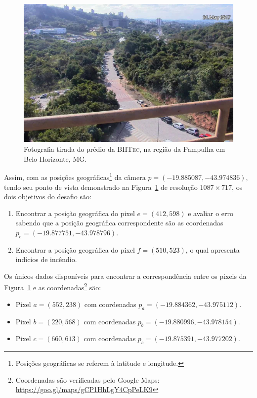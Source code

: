\documentclass[12pt]{report}
\begin{document}
{\begin{figure}[!h]
	\centering
	\includegraphics[width=0.85\columnwidth]{images/cemig-pic.jpg}
	\caption{Fotografia tirada do prédio da \textsc{BHTec}, na região da Pampulha em Belo Horizonte, MG.}
	\label{fig:bhtec}
\end{figure}

\noindent Assim, com as posições geográficas\footnote{Posições geográficas se referem à latitude e longitude.} da câmera $p = (-19.885087, -43.974836)$, tendo seu ponto de vista demonstrado na Figura~\ref{fig:bhtec} de resolução $1087 \times 717$, os dois objetivos do desafio são:
\begin{enumerate}
	\item Encontrar a posição geográfica do pixel $e = (412, 598)$ e avaliar o erro sabendo que a posição geográfica correspondente são as coordenadas $p_{e} = (-19.877751, -43.978796)$.
	\item Encontrar a posição geográfica do pixel $f = (510, 523)$, o qual apresenta indícios de incêndio.
\end{enumerate}

\noindent Os únicos dados disponíveis para encontrar a correspondência entre os pixeis da Figura~\ref{fig:bhtec} e as coordenadas\footnote{Coordenadas são verificadas pelo Google Maps: \url{https://goo.gl/maps/gCP1HhLgY4CpPeLK9}} são:
\begin{itemize}
	\item Pixel $a = (552, 238)$ com coordenadas $p_{a} = (-19.884362, -43.975112)$.
	\item Pixel $b = (220, 568)$ com coordenadas $p_{b} = (-19.880996, -43.978154)$.
	\item Pixel $c = (660, 613)$ com coordenadas $p_{c} = (-19.875391, -43.977202)$.
\end{itemize}

}
\end{document}
